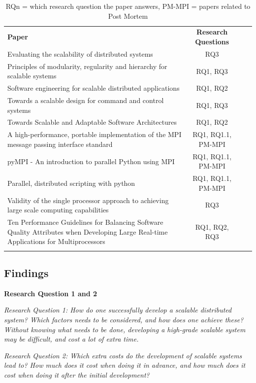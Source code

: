 \documentclass{article}
\begin{document}
\begin{table}[H]
\begin{tabular}{p{8cm} c c r}
  \rowcolor[gray]{0.5}
  {\bf Paper} & {\bf Research Questions} \\
  Evaluating the scalability of distributed systems & RQ3 \\
  Principles of modularity, regularity and hierarchy for scalable systems & RQ1, RQ3 \\
  Software engineering for scalable distributed applications & RQ1, RQ2 \\
  Towards a scalable design for command and control systems & RQ1, RQ3 \\
  Towards Scalable and Adaptable Software Architectures & RQ1, RQ2 \\
  A high-performance, portable implementation of the MPI message passing interface standard & RQ1, RQ1.1, PM-MPI \\
  pyMPI - An introduction to parallel Python using MPI & RQ1, RQ1.1, PM-MPI \\
  Parallel, distributed scripting with python & RQ1, RQ1.1, PM-MPI \\
  Validity of the single processor approach to achieving large scale computing capabilities & RQ3 \\
  Ten Performance Guidelines for Balancing Software Quality Attributes when Developing Large Real-time Applications for Multiprocessors & RQ1, RQ2, RQ3 \\
  
\rowcolor[gray]{0.5}
\end{tabular}
\caption{RQ{n} = which research question the paper answers,
 PM-MPI = papers related to Post Mortem }
\end{table}

\subsection{Findings}

\textbf{Research Question 1 and 2}

{\scriptsize \emph{Research Question 1: How do one successfully develop a
scalable distributed system? Which factors needs to be considered, and how does
one achieve these? Without knowing what needs to be done, developing a
high-grade scalable system may be difficult, and cost a lot of extra time.}}

{\scriptsize \emph{Research Question 2: Which extra costs do the development of
scalable systems lead to? How much does it cost when doing it in advance, and
how much does it cost when doing it after the initial development?}}
\\
\end{document}
